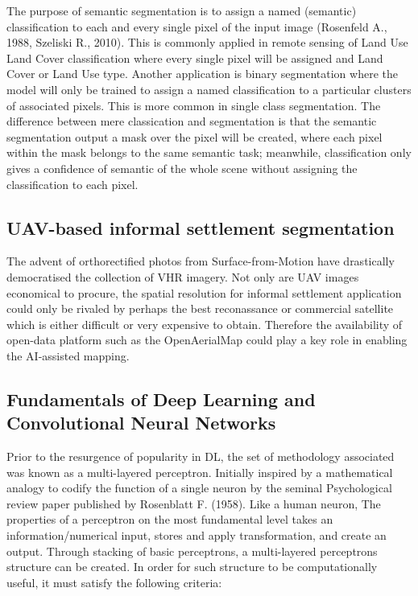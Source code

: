 \documentclass[11pt, a4paper, twoside]{report}
\begin{document}
The purpose of semantic segmentation is to assign a named (semantic) classification to each and every single pixel of the input image (Rosenfeld A., 1988, Szeliski R., 2010). This is commonly applied in remote sensing of Land Use Land Cover classification where every single pixel will be assigned and Land Cover or Land Use type. Another application is binary segmentation where the model will only be trained to assign a named classification to a particular clusters of associated pixels. This is more common in single class segmentation. The difference between mere classication and segmentation is that the semantic segmentation output a mask over the pixel will be created, where each pixel within the mask belongs to the same semantic task; meanwhile, classification only gives a confidence of semantic of the whole scene without assigning the classification to each pixel.\\\par


\subsection{UAV-based informal settlement segmentation}\label{CVandCNN}

The advent of orthorectified photos from Surface-from-Motion have drastically democratised the collection of VHR imagery. Not only are UAV images economical to procure, the spatial resolution for informal settlement application could only be rivaled by perhaps the best reconassance or commercial satellite which is either difficult or very expensive to obtain. Therefore the availability of open-data platform such as the OpenAerialMap could play a key role in enabling the AI-assisted mapping.\\\par

\subsection{Fundamentals of Deep Learning and Convolutional Neural Networks}

Prior to the resurgence of popularity in DL, the set of methodology associated was known as a multi-layered perceptron. Initially inspired by a mathematical analogy to codify the function of a single neuron by the seminal Psychological review paper published by Rosenblatt F. (1958). Like a human neuron, The properties of a perceptron on the most fundamental level takes an information/numerical input, stores and apply transformation, and create an output. Through stacking of basic perceptrons, a multi-layered perceptrons structure can be created. In order for such structure to be computationally useful, it must satisfy the following criteria:\\\par
\end{document}
